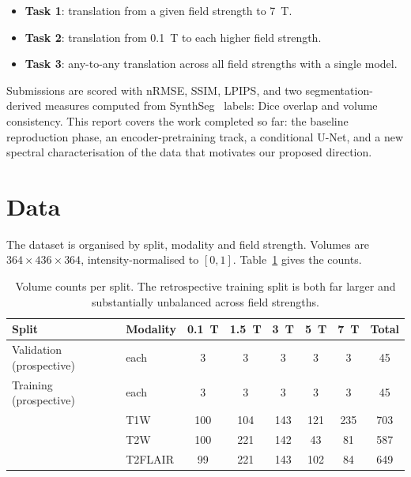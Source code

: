 \documentclass[11pt,a4paper]{article}
\newcommand{\rmse}{nRMSE}
\begin{document}
\begin{itemize}
  \item \textbf{Task 1}: translation from a given field strength to \SI{7}{\tesla}.
  \item \textbf{Task 2}: translation from \SI{0.1}{\tesla} to each higher field strength.
  \item \textbf{Task 3}: any-to-any translation across all field strengths with a single model.
\end{itemize}

Submissions are scored with \rmse{}, SSIM, LPIPS, and two segmentation-derived measures computed from
SynthSeg~\cite{billot2023synthseg} labels: Dice overlap and volume consistency. This report covers the work completed so far:
the baseline reproduction phase, an encoder-pretraining track, a conditional U-Net, and a new spectral
characterisation of the data that motivates our proposed direction.

\section{Data}
\label{sec:data}

The dataset is organised by split, modality and field strength. Volumes are
$364 \times 436 \times 364$, intensity-normalised to
$[0,1]$. Table~\ref{tab:data} gives the counts.

\begin{table}[t]
  \centering
  \small
  \caption{Volume counts per split. The retrospective training split is both far larger and
  substantially unbalanced across field strengths.}
  \label{tab:data}
  \begin{tabular}{llccccc c}
    \toprule
    Split & Modality & \SI{0.1}{\tesla} & \SI{1.5}{\tesla} & \SI{3}{\tesla} & \SI{5}{\tesla} & \SI{7}{\tesla} & Total \\
    \midrule
    \multirow{1}{*}{Validation (prospective)} & each & 3 & 3 & 3 & 3 & 3 & 45 \\
    \addlinespace
    Training (prospective) & each & 3 & 3 & 3 & 3 & 3 & 45 \\
    \addlinespace
    \multirow{3}{*}{Training (retrospective)}
      & T1W     & 100 & 104 & 143 & 121 & 235 & 703 \\
      & T2W     & 100 & 221 & 142 &  43 &  81 & 587 \\
      & T2FLAIR &  99 & 221 & 143 & 102 &  84 & 649 \\
    \bottomrule
  \end{tabular}
\end{table}
\end{document}
